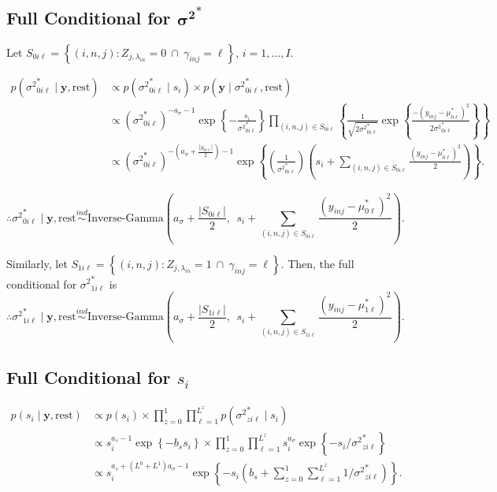 \documentclass[12pt,]{article}
\newcommand{\p}[1]{\left(#1\right)}
\newcommand{\bc}[1]{ \left\{#1\right\} }
\newcommand{\abs}[1]{ \left|#1\right| }
\newcommand{\ind}{\overset{ind}{\sim}}
\def\IG{\text{Inverse-Gamma}}
\def\lin{\lambda_{in}}
\def\y{\bm{y}}
\def\mus{\mu^*}
\def\sss{{\sigma^2}^*}
\def\rest{\text{rest}}
\begin{document}
\subsection{\texorpdfstring{Full Conditional for
\(\bm{{\sigma^2}}^*\)}{Full Conditional for \textbackslash{}bm\{\{\textbackslash{}sigma\^{}2\}\}\^{}*}}\label{full-conditional-for-bmsigma2}

Let
\(S_{0i\ell} = \bc{(i, n,j): Z_{j,\lin} = 0 ~\cap~ \gamma_{inj}=\ell}\),
\(i=1, \ldots, I\).

\begin{align*}
p(\sss_{0i\ell} \mid \y, \rest) &\propto p(\sss_{0i\ell} \mid s_i) \times p(\y \mid \sss_{0i\ell}, \rest) \\
&\propto (\sss_{0i\ell})^{-a_\sigma-1} \exp\bc{-\frac{s_i}{\sss_{0i\ell}}} 
\prod_{(i,n,j)\in S_{0i\ell}} \bc{
  \frac{1}{\sqrt{2\sss_{0i\ell}}}
  \exp\bc{\frac{-(y_{inj}-\mus_{0\ell})^2}{2\sss_{0i\ell}}}
} \\
&\propto (\sss_{0i\ell})^{-(a_\sigma + \frac{\abs{S_{0i\ell}}}{2})-1}
\exp\bc{\p{\frac{1}{\sss_{0i\ell}}}\p{s_i + \sum_{(i,n,j)\in S_{0i\ell}}
\frac{(y_{inj}-\mus_{0\ell})^2}{2}
}}.
\end{align*}

\[
\therefore \sss_{0i\ell} \mid \y, \rest \ind
\IG\p{a_\sigma + \frac{\abs{S_{0i\ell}}}{2}, ~~ s_i + \sum_{(i,n,j)\in S_{0i\ell}}
\frac{(y_{inj}-\mus_{0\ell})^2}{2}
}.
\]

Similarly, let
\(S_{1i\ell} = \bc{(i, n,j): Z_{j,\lin} = 1 ~\cap~ \gamma_{inj}=\ell}\).
Then, the full conditional for \(\sss_{1i\ell}\) is \[
\therefore \sss_{1i\ell} \mid \y, \rest \ind
\IG\p{a_\sigma + \frac{\abs{S_{1i\ell}}}{2}, ~~ s_i + \sum_{(i,n,j)\in S_{1i\ell}}
\frac{(y_{inj}-\mus_{1\ell})^2}{2}
}.
\]

\subsection{\texorpdfstring{Full Conditional for
\(s_i\)}{Full Conditional for s\_i}}\label{full-conditional-for-s_i}

\begin{align*}
p(s_i \mid \y, \rest) &\propto p(s_i) \times \prod_{z=0}^1 \prod_{\ell=1}^{L^z} p(\sss_{zi\ell} \mid s_i)\\
&\propto s_i^{a_s-1} \exp\bc{-b_s s_i} \times \prod_{z=0}^1  \prod_{\ell=1}^{L^z} s_i^{a_\sigma} \exp\bc{-s_i / \sss_{zi\ell}} \\
&\propto s_i^{a_s + (L^0 + L^1)a_\sigma - 1} \exp\bc{-s_i \p{b_s + \sum_{z=0}^1 \sum_{\ell=1}^{L^z} 1 / \sss_{zi\ell}}}.
\end{align*}
\end{document}
